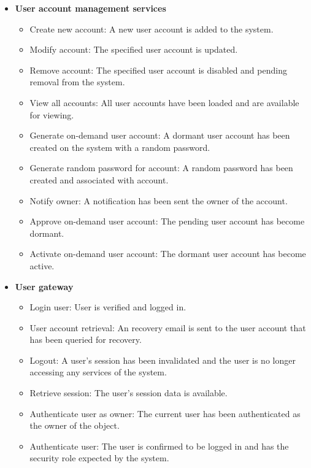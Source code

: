 \documentclass[12pt]{article}
\begin{document}
\begin{itemize}
	\item \textbf{User account management services}
		\begin{itemize}
			\item Create new account: A new user account is added to the system.
			\item Modify account: The specified user account is updated.				
			\item Remove account: The specified user account is disabled and pending removal from the system.
			\item View all accounts: All user accounts have been loaded and are available for viewing.
			\item Generate on-demand user account: A dormant user account has been created on the system with a random password.
			\item Generate random password for account: A random password has been created and associated with account.
			\item Notify owner: A notification has been sent the owner of the account.
			\item Approve on-demand user account: The pending user account has become dormant.
			\item Activate on-demand user account: The dormant user account has become active.						
		\end{itemize}
	
	\item \textbf{User gateway}
		\begin{itemize}
			\item Login user: User is verified and logged in.
			\item User account retrieval: An recovery email is sent to the user account that has been queried for recovery.				
			\item Logout: A user's session has been invalidated and the user is no longer accessing any services of the system.
			\item Retrieve session: The user's session data is available.
			\item Authenticate user as owner: The current user has been authenticated as the owner of the object.
			\item Authenticate user: The user is confirmed to be logged in and has the security role expected by the system.						
		\end{itemize}
		

\end{itemize}
\end{document}
